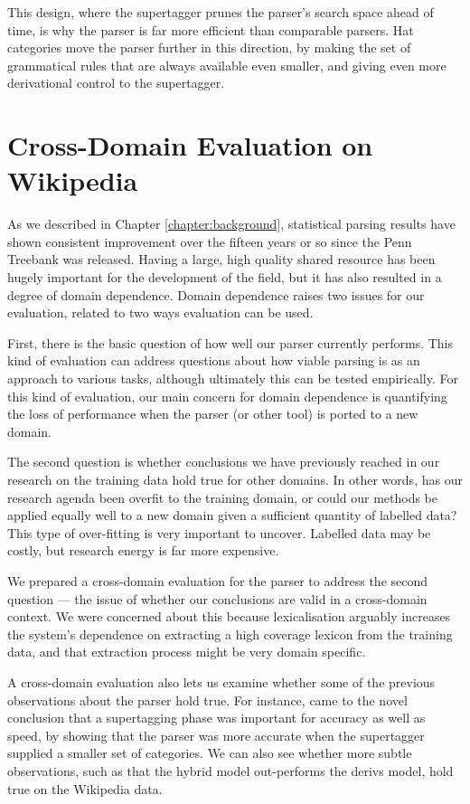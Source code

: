 This design, where the supertagger prunes the parser's search space ahead of time,
is why the \candc parser is far more efficient than comparable parsers. Hat categories
move the parser further in this direction, by making the set of grammatical rules that
are always available even smaller, and giving even more derivational control to the
supertagger.



\section{Cross-Domain Evaluation on Wikipedia}
\label{sec:wikipedia_results}

As we described in Chapter \ref{chapter:background}, statistical parsing results
have shown consistent improvement over the fifteen years or so since the Penn
Treebank was released. Having a large, high quality shared resource has been
hugely important for the development of the field, but it has also resulted in a
degree of domain dependence. Domain dependence raises two issues for our
evaluation, related to two ways evaluation can be used.

First, there is the basic question of how well our parser currently performs.
This kind of evaluation can address questions about how viable parsing is as an
approach to various tasks, although ultimately this can be tested empirically.
For this kind of evaluation, our main concern for domain dependence is
quantifying the loss of performance when the parser (or other \nlp tool) is
ported to a new domain.

The second question is whether conclusions we have previously reached in our
research on the training data hold true for other domains. In other words, has
our research agenda been overfit to the training domain, or could our methods be
applied equally well to a new domain given a sufficient quantity of labelled
data? This type of over-fitting is very important to uncover. Labelled data may
be costly, but research energy is far more expensive.

We prepared a cross-domain evaluation for the \candc parser to address the
second question --- the issue of whether our conclusions are valid in a
cross-domain context. We were concerned about this because lexicalisation
arguably increases the system's dependence on extracting a high coverage lexicon
from the training data, and that extraction process might be very domain
specific.

A cross-domain evaluation also lets us examine whether some of the previous
observations about the \candc parser hold true. For instance,
\citet{clark:acl04} came to the novel conclusion that a supertagging phase was
important for accuracy as well as speed, by showing that the parser was more
accurate when the supertagger supplied a smaller set of categories. We can also
see whether more subtle observations, such as that the hybrid model out-performs
the derivs model, hold true on the Wikipedia data.

